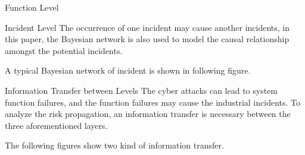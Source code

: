 \begin{frame}{Function Level}
    \begin{overlayarea}{\textwidth}{6cm}
    \begin{center}
      
    \end{center}
    \end{overlayarea}
\end{frame}

\begin{frame}{Incident Level}
    The occurrence of one incident may cause another incidents, in this paper, the Bayesian network is also used to model the causal relationship amongst the potential incidents.

    A typical Bayesian network of incident is shown in following figure.

    \begin{center}
      
    \end{center}
\end{frame}

\begin{frame}{Information Transfer between Levels}
    The cyber attacks can lead to system function failures, and the function failures may cause the industrial incidents. To analyze the risk propagation, an information transfer is necessary between the three aforementioned layers.

    The following figures show two kind of information transfer.

    \begin{center}
    \end{center}
\end{frame}

